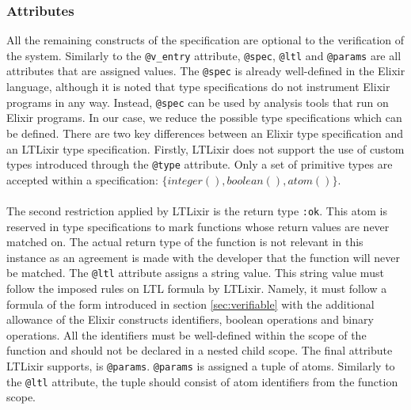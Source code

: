 \subsubsection{Attributes}
All the remaining constructs of the specification are optional to the verification of the system. Similarly to the \texttt{@v\_entry} attribute, \texttt{@spec}, \texttt{@ltl} and \texttt{@params} are all attributes that are assigned values. The \texttt{@spec} is already well-defined in the Elixir language, although it is noted that type specifications do not instrument Elixir programs in any way. Instead, \texttt{@spec} can be used by analysis tools that run on Elixir programs. In our case, we reduce the possible type specifications which can be defined. There are two key differences between an Elixir type specification and an LTLixir type specification. Firstly, LTLixir does not support the use of custom types introduced through the \texttt{@type} attribute. Only a set of primitive types are accepted within a specification: $\{integer(), boolean(), atom()\}$.
\\ \\
The second restriction applied by LTLixir is the return type \texttt{:ok}. This atom is reserved in type specifications to mark functions whose return values are never matched on. The actual return type of the function is not relevant in this instance as an agreement is made with the developer that the function will never be matched. The \texttt{@ltl} attribute assigns a string value. This string value must follow the imposed rules on LTL formula by LTLixir. Namely, it must follow a formula of the form introduced in section \ref{sec:verifiable} with the additional allowance of the Elixir constructs identifiers, boolean operations and binary operations. All the identifiers must be well-defined within the scope of the function and should not be declared in a nested child scope. The final attribute LTLixir supports, is \texttt{@params}. \texttt{@params} is assigned a tuple of atoms. Similarly to the \texttt{@ltl} attribute, the tuple should consist of atom identifiers from the function scope.
\\ \\
